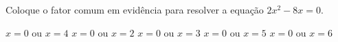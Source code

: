 Coloque o fator comum em evidência para resolver a equação $2x^2-8x=0$.

$x=0$ ou $x=4$
$x=0$ ou $x=2$
$x=0$ ou $x=3$
$x=0$ ou $x=5$
$x=0$ ou $x=6$


